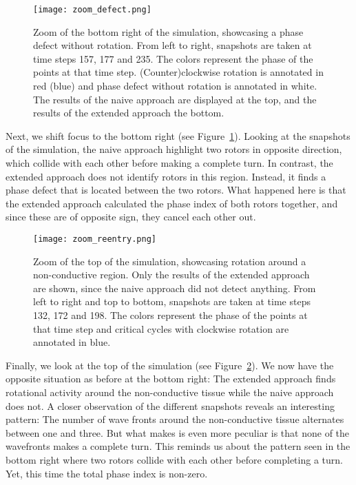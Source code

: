 \documentclass[twocolumn]{article}
\begin{document}
\begin{figure}[ht]
  \centering
  \texttt{[image: zoom\_defect.png]}
  \caption{Zoom of the bottom right of the simulation, showcasing a phase
    defect without rotation. From left to right, snapshots are taken at time
    steps 157, 177 and 235. The colors represent the phase of the points at
    that time step. (Counter)clockwise rotation is annotated in red (blue)
    and phase defect without rotation is annotated in white. The results of
    the naive approach are displayed at the top, and the results of the
  extended approach the bottom.}
  \label{fig:zoom-defect}
\end{figure}

Next, we shift focus to the bottom right (see
Figure~\ref{fig:zoom-defect}). Looking at the snapshots of the simulation,
the naive approach highlight two rotors in opposite direction, which
collide with each other before making a complete turn. In contrast, the
extended approach does not identify rotors in this region. Instead, it
finds a phase defect that is located between the two rotors. What
happened here is that the extended approach calculated the phase index
of both rotors together, and since these are of opposite sign, they
cancel each other out.

\begin{figure}[ht]
  \centering
  \texttt{[image: zoom\_reentry.png]}
  \caption{Zoom of the top of the simulation, showcasing rotation around a
    non-conductive region. Only the results of the extended approach are
    shown, since the naive approach did not detect anything. From left to
    right and top to bottom, snapshots are taken at time steps 132, 172 and
    198. The colors represent the phase of the points at that time step and
  critical cycles with clockwise rotation are annotated in blue.}
  \label{fig:zoom-reentry}
\end{figure}

Finally, we look at the top of the simulation (see
Figure~\ref{fig:zoom-reentry}). We now have the opposite situation as
before at the bottom right: The extended approach finds rotational
activity around the non-conductive tissue while the naive approach does
not. A closer observation of the different snapshots reveals an
interesting pattern: The number of wave fronts around the non-conductive
tissue alternates between one and three. But what makes is even more
peculiar is that none of the wavefronts makes a complete turn. This
reminds us about the pattern seen in the bottom right where two rotors
collide with each other before completing a turn. Yet, this time the
total phase index is non-zero.
\end{document}
